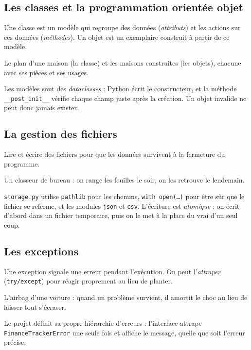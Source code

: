 \documentclass[11pt,a4paper]{article}
\newcommand{\code}[1]{{\NoAutoSpacing\texttt{#1}}}
\begin{document}
\subsection{Les classes et la programmation orientée objet}
\begin{definition}
Une classe est un modèle qui regroupe des données (\emph{attributs}) et les actions sur ces
données (\emph{méthodes}). Un objet est un exemplaire construit à partir de ce modèle.
\end{definition}
\begin{analogie}
Le plan d'une maison (la classe) et les maisons construites (les objets), chacune avec ses
pièces et ses usages.
\end{analogie}
Les modèles sont des \emph{dataclasses} : Python écrit le constructeur, et la méthode
\code{\_\_post\_init\_\_} vérifie chaque champ juste après la création. Un objet invalide ne
peut donc jamais exister.


\subsection{La gestion des fichiers}
\begin{definition}
Lire et écrire des fichiers pour que les données survivent à la fermeture du programme.
\end{definition}
\begin{analogie}
Un classeur de bureau : on range les feuilles le soir, on les retrouve le lendemain.
\end{analogie}
\code{storage.py} utilise \code{pathlib} pour les chemins, \code{with open(\dots)} pour être
sûr que le fichier se referme, et les modules \code{json} et \code{csv}. L'écriture est
\emph{atomique} : on écrit d'abord dans un fichier temporaire, puis on le met à la place du
vrai d'un seul coup.


\subsection{Les exceptions}
\begin{definition}
Une exception signale une erreur pendant l'exécution. On peut l'\emph{attraper}
(\code{try/except}) pour réagir proprement au lieu de planter.
\end{definition}
\begin{analogie}
L'airbag d'une voiture : quand un problème survient, il amortit le choc au lieu de laisser
tout s'écraser.
\end{analogie}
Le projet définit sa propre hiérarchie d'erreurs : l'interface attrape
\code{FinanceTrackerError} une seule fois et affiche le message, quelle que soit l'erreur
précise.

\end{document}
